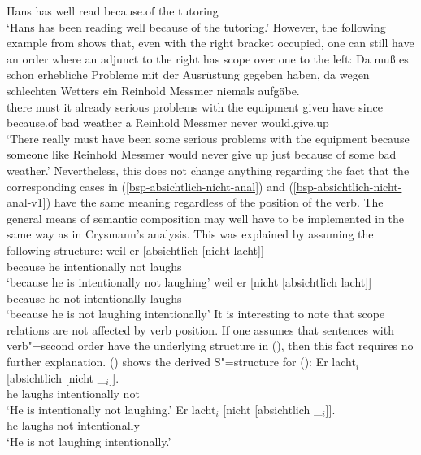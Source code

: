 \begin{enumerate}
{{	 Hans has well read because.of the tutoring\\
\glt `Hans has been reading well because of the tutoring.'
}
\zl
However, the following example from \citet[]{Crysmann2004a} shows that, even with the right bracket occupied, one can still have an
order where an adjunct to the right has scope over one to the left:
\ea
\gll Da muß es schon erhebliche Probleme mit der Ausrüstung gegeben haben, da wegen schlechten
  Wetters ein Reinhold Messmer niemals aufgäbe.\\
  there must it already serious problems with the equipment given have since because.of bad weather a Reinhold Messmer never
  would.give.up\\
 \glt `There really must have been some serious problems with the equipment because someone like Reinhold Messmer would never give
  up just because of some bad weather.'
\z
Nevertheless, this does not change anything regarding the fact that the corresponding cases in (\ref{bsp-absichtlich-nicht-anal}) 
and (\ref{bsp-absichtlich-nicht-anal-v1}) have the same meaning regardless of the position of the verb. The general means of semantic
composition may well have to be implemented in the same way as in Crysmann's analysis.%
}
\fnlabelindent{0em}
This was explained by assuming the following structure:
\eal
\label{bsp-absichtlich-nicht-anal}
\ex 
\gll weil er [absichtlich [nicht lacht]]\\
	 because he \spacebr{}intentionally \spacebr{}not laughs\\
\glt `because he is intentionally not laughing'
\ex 
\gll weil er [nicht [absichtlich lacht]]\\
     because he \spacebr{}not \spacebr{}intentionally laughs\\
\glt `because he is not laughing intentionally'
\zl
It is interesting to note that scope relations are not affected by verb position. If one assumes that sentences with verb"=second
order have the underlying structure in (), then this fact requires no further explanation. () shows
the derived S"=structure for ():
\eal
\label{bsp-absichtlich-nicht-anal-v1}
\ex 
\gll Er lacht$_i$ [absichtlich [nicht \_$_i$]].\\
     he laughs \spacebr{}intentionally \spacebr{}not\\
\glt `He is intentionally not laughing.'
\ex 
\gll Er lacht$_i$  [nicht [absichtlich \_$_i$]].\\
     he laughs \spacebr{}not \spacebr{}intentionally\\
\glt `He is not laughing intentionally.'
\zl{}
\nocite{Hoehle88a,Hoehle97a}
\end{enumerate}

